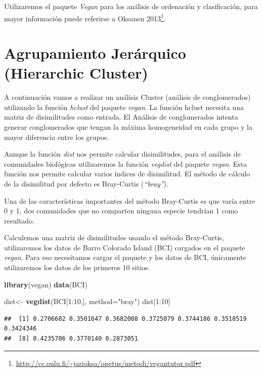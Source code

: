 \documentclass[]{book}
\newenvironment{Shaded}{\begin{snugshade}}{\end{snugshade}}
\newcommand{\KeywordTok}[1]{\textcolor[rgb]{0.13,0.29,0.53}{\textbf{{#1}}}}
\newcommand{\DataTypeTok}[1]{\textcolor[rgb]{0.13,0.29,0.53}{{#1}}}
\newcommand{\DecValTok}[1]{\textcolor[rgb]{0.00,0.00,0.81}{{#1}}}
\newcommand{\StringTok}[1]{\textcolor[rgb]{0.31,0.60,0.02}{{#1}}}
\newcommand{\NormalTok}[1]{{#1}}
\let\rmarkdownfootnote\footnote%
\def\footnote{\protect\rmarkdownfootnote}
\begin{document}
Utilizaremos el paquete \emph{Vegan} para los análisis de ordenación y
clasificación, para mayor información puede referirse a Oksanen
2013\footnote{\url{http://cc.oulu.fi/~jarioksa/opetus/metodi/vegantutor.pdf}}.

\section{Agrupamiento Jerárquico (Hierarchic
Cluster)}\label{agrupamiento-jerarquico-hierarchic-cluster}

A continuación vamos a realizar un análisis Cluster (análisis de
conglomerados) utilizando la función \emph{hclust} del paquete
\emph{vegan}. La función hclust necesita una matriz de disimilitudes
como entrada. El Análisis de conglomerados intenta generar conglomerados
que tengan la máxima homogeneidad en cada grupo y la mayor diferencia
entre los grupos.

Aunque la función \emph{dist} nos permite calcular disimilitudes, para
el análisis de comunidades biológicas utilizaremos la función
\emph{vegdist} del paquete \emph{vegan}. Esta función nos permite
calcular varios índices de disimilitud. El método de cálculo de la
disimilitud por defecto es Bray-Curtis (\emph{``bray''}).

Una de las características importantes del método Bray-Curtis es que
varía entre 0 y 1, dos comunidades que no comparten ninguna especie
tendrían 1 como resultado.

Calculemos una matriz de disimilitudes usando el método Bray-Curtis,
utilizaremos los datos de Barro Colorado Island (BCI) cargados en el
paquete \emph{vegan}. Para eso necesitamos cargar el paquete y los datos
de BCI, únicamente utilizaremos los datos de los primeros 10 sitios.

\begin{Shaded}
\begin{Highlighting}[]
\KeywordTok{library}\NormalTok{(vegan)}
\KeywordTok{data}\NormalTok{(BCI)}

\NormalTok{dist<-}\StringTok{ }\KeywordTok{vegdist}\NormalTok{(BCI[}\DecValTok{1}\NormalTok{:}\DecValTok{10}\NormalTok{,], }\DataTypeTok{method=}\StringTok{"bray"}\NormalTok{)}
\NormalTok{dist[}\DecValTok{1}\NormalTok{:}\DecValTok{10}\NormalTok{]}
\end{Highlighting}
\end{Shaded}

\begin{verbatim}
##  [1] 0.2706682 0.3501647 0.3682008 0.3725079 0.3744186 0.3518519 0.3424346
##  [8] 0.4235706 0.3770140 0.2873051
\end{verbatim}
\end{document}
